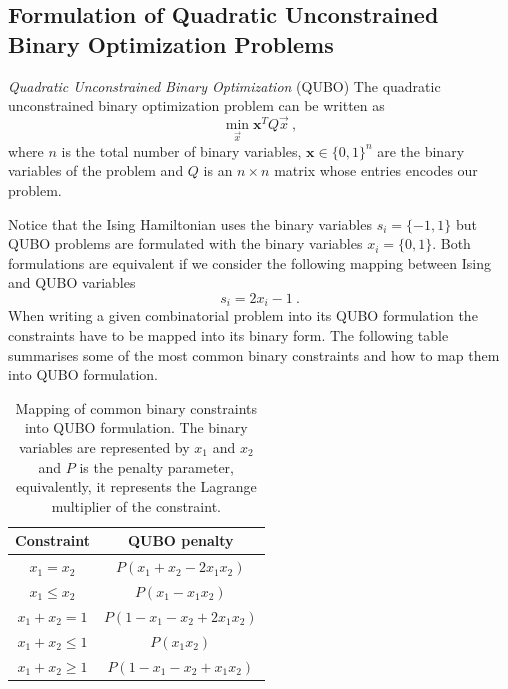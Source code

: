 \subsection{Formulation of Quadratic Unconstrained Binary Optimization Problems}
\begin{definition}{\textit{Quadratic Unconstrained Binary Optimization} (QUBO)}{}
   The quadratic unconstrained binary optimization problem can be written as
\begin{equation}
    \min_{\vec{x}}\mathbf{x}^{T}Q\vec{x}\ ,
\end{equation}
where $n$ is the total number of binary variables, $\mathbf{x}\in\{0,1\}^{n}$ are the binary variables of the problem and $Q$ is an $n\times n$ matrix whose entries encodes our problem.
\end{definition}
Notice that the Ising Hamiltonian uses the binary variables $s_{i} = \{-1,1\}$ but QUBO problems are formulated with the binary variables $x_{i} = \{0,1\}$. Both formulations are equivalent if we consider the following mapping between Ising and QUBO variables
\begin{equation}
\label{eq: ISING_QUBO}
    s_{i} = 2x_{i} - 1\ .
\end{equation}
When writing a given combinatorial problem into its QUBO formulation the constraints have to be mapped into its binary form. The following table summarises some of the most common binary constraints and how to map them into QUBO formulation.
\begin{table}[H]
\centering
\begin{tabular}{ |c|c| }
 \hline
 \textbf{Constraint} & \textbf{QUBO penalty} \\
 \hline
 $x_{1}=x_{2}$ & $P\left(x_{1} + x_{2} -2x_{1}x_{2}\right)$  \\
 \hline
 $x_{1}\leq x_{2}$ &  $P\left(x_{1} -x_{1}x_{2}\right)$   \\
 \hline
 $x_{1} + x_{2} = 1$ & $P\left(1-x_{1}-x_{2}+2x_{1}x_{2}\right)$ \\
 \hline
 $x_{1} + x_{2} \leq 1$    & $P\left(x_{1}x_{2}\right)$ \\
 \hline
$x_{1} + x_{2} \geq 1$ &   $P\left(1-x_{1}-x_{2}+x_{1}x_{2}\right)$ \\
 \hline
\end{tabular}
\caption{Mapping of common binary constraints into QUBO formulation. The binary variables are represented by $x_{1}$ and $x_{2}$ and $P$ is the penalty parameter, equivalently, it represents the Lagrange multiplier of the constraint.}
\end{table}
